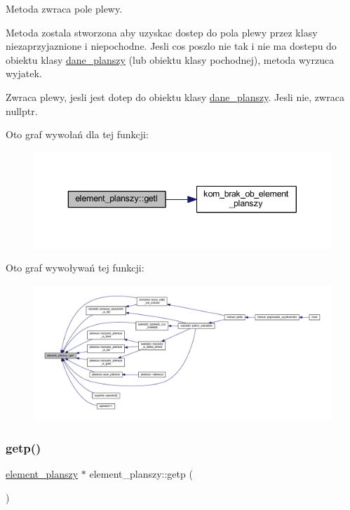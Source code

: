 Metoda zwraca pole plewy.

Metoda zostala stworzona aby uzyskac dostep do pola plewy przez klasy niezaprzyjaznione i niepochodne. Jesli cos poszlo nie tak i nie ma dostepu do obiektu klasy \mbox{\hyperlink{classdane__planszy}{dane\+\_\+planszy}} (lub obiektu klasy pochodnej), metoda wyrzuca wyjatek. \begin{DoxyReturn}{Zwraca}
plewy, jesli jest dotep do obiektu klasy \mbox{\hyperlink{classdane__planszy}{dane\+\_\+planszy}}. Jesli nie, zwraca nullptr. 
\end{DoxyReturn}
Oto graf wywołań dla tej funkcji\+:
\nopagebreak
\begin{figure}[H]
\begin{center}
\leavevmode
\includegraphics[width=343pt]{classelement__planszy_a5be5b94cdbbdf68ec426d55789c6579a_cgraph}
\end{center}
\end{figure}
Oto graf wywoływań tej funkcji\+:
\nopagebreak
\begin{figure}[H]
\begin{center}
\leavevmode
\includegraphics[width=350pt]{classelement__planszy_a5be5b94cdbbdf68ec426d55789c6579a_icgraph}
\end{center}
\end{figure}
\mbox{\label{classelement__planszy_a7b72040bbb58d9092a63ed2d0fd18dca}} 
\subsubsection{\texorpdfstring{getp()}{getp()}}
{\footnotesize\ttfamily \mbox{\hyperlink{classelement__planszy}{element\+\_\+planszy}} $\ast$ element\+\_\+planszy\+::getp (\begin{DoxyParamCaption}{ }\end{DoxyParamCaption})}

